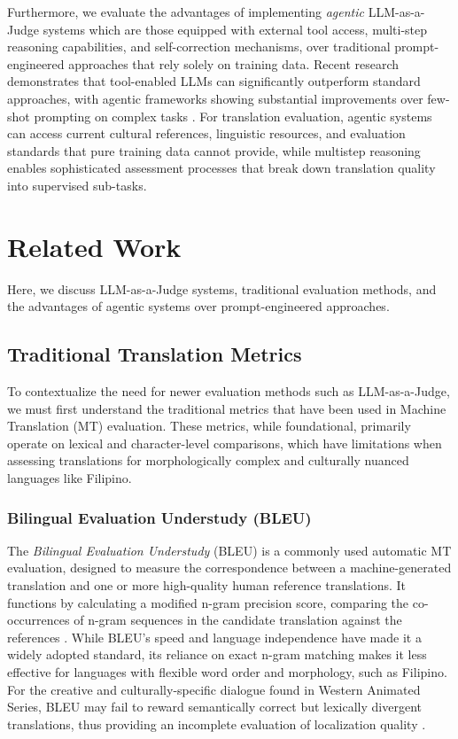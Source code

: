 \documentclass[conference]{IEEEtran}
\begin{document}
Furthermore, we evaluate the advantages of implementing \textit{agentic} LLM-as-a-Judge systems which are those equipped with external tool access, multi-step reasoning capabilities, and self-correction mechanisms, over traditional prompt-engineered approaches that rely solely on training data. Recent research demonstrates that tool-enabled LLMs can significantly outperform standard approaches, with agentic frameworks showing substantial improvements over few-shot prompting on complex tasks \cite{paranjape_art_2023}. For translation evaluation, agentic systems can access current cultural references, linguistic resources, and evaluation standards that pure training data cannot provide, while multistep reasoning enables sophisticated assessment processes that break down translation quality into supervised sub-tasks.

\section{Related Work}

Here, we discuss LLM-as-a-Judge systems, traditional evaluation methods, and the advantages of agentic systems over prompt-engineered approaches.

\subsection{Traditional Translation Metrics}

To contextualize the need for newer evaluation methods such as LLM-as-a-Judge, we must first understand the traditional metrics that have been used in Machine Translation (MT) evaluation. These metrics, while foundational, primarily operate on lexical and character-level comparisons, which have limitations when assessing translations for morphologically complex and culturally nuanced languages like Filipino.

\subsubsection{Bilingual Evaluation Understudy (BLEU)}

The \textit{Bilingual Evaluation Understudy} (BLEU) is a commonly used automatic MT evaluation, designed to measure the correspondence between a machine-generated translation and one or more high-quality human reference translations. It functions by calculating a modified n-gram precision score, comparing the co-occurrences of n-gram sequences in the candidate translation against the references \cite{papineni_bleu_2001}. While BLEU's speed and language independence have made it a widely adopted standard, its reliance on exact n-gram matching makes it less effective for languages with flexible word order and morphology, such as Filipino. For the creative and culturally-specific dialogue found in Western Animated Series, BLEU may fail to reward semantically correct but lexically divergent translations, thus providing an incomplete evaluation of localization quality \cite{juraska_metricx-24_2024}.
\end{document}
